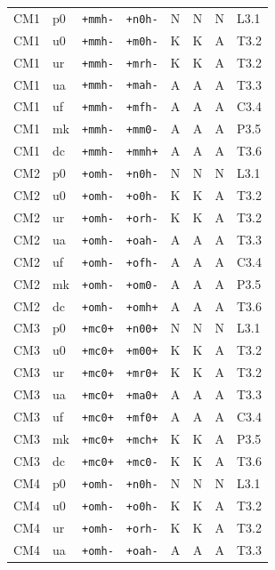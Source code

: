 {\begin{longtable}{@{}llllcccl@{}}
CM1 & p0 & \texttt{+mmh-} & \texttt{+n0h-} & N & N & N & L3.1 \\
CM1 & u0 & \texttt{+mmh-} & \texttt{+m0h-} & K & K & A & T3.2 \\
CM1 & ur & \texttt{+mmh-} & \texttt{+mrh-} & K & K & A & T3.2 \\
CM1 & ua & \texttt{+mmh-} & \texttt{+mah-} & A & A & A & T3.3 \\
CM1 & uf & \texttt{+mmh-} & \texttt{+mfh-} & A & A & A & C3.4 \\
CM1 & mk & \texttt{+mmh-} & \texttt{+mm0-} & A & A & A & P3.5 \\
CM1 & dc & \texttt{+mmh-} & \texttt{+mmh+} & A & A & A & T3.6 \\
CM2 & p0 & \texttt{+omh-} & \texttt{+n0h-} & N & N & N & L3.1 \\
CM2 & u0 & \texttt{+omh-} & \texttt{+o0h-} & K & K & A & T3.2 \\
CM2 & ur & \texttt{+omh-} & \texttt{+orh-} & K & K & A & T3.2 \\
CM2 & ua & \texttt{+omh-} & \texttt{+oah-} & A & A & A & T3.3 \\
CM2 & uf & \texttt{+omh-} & \texttt{+ofh-} & A & A & A & C3.4 \\
CM2 & mk & \texttt{+omh-} & \texttt{+om0-} & A & A & A & P3.5 \\
CM2 & dc & \texttt{+omh-} & \texttt{+omh+} & A & A & A & T3.6 \\
CM3 & p0 & \texttt{+mc0+} & \texttt{+n00+} & N & N & N & L3.1 \\
CM3 & u0 & \texttt{+mc0+} & \texttt{+m00+} & K & K & A & T3.2 \\
CM3 & ur & \texttt{+mc0+} & \texttt{+mr0+} & K & K & A & T3.2 \\
CM3 & ua & \texttt{+mc0+} & \texttt{+ma0+} & A & A & A & T3.3 \\
CM3 & uf & \texttt{+mc0+} & \texttt{+mf0+} & A & A & A & C3.4 \\
CM3 & mk & \texttt{+mc0+} & \texttt{+mch+} & K & K & A & P3.5 \\
CM3 & dc & \texttt{+mc0+} & \texttt{+mc0-} & K & K & A & T3.6 \\
CM4 & p0 & \texttt{+omh-} & \texttt{+n0h-} & N & N & N & L3.1 \\
CM4 & u0 & \texttt{+omh-} & \texttt{+o0h-} & K & K & A & T3.2 \\
CM4 & ur & \texttt{+omh-} & \texttt{+orh-} & K & K & A & T3.2 \\
CM4 & ua & \texttt{+omh-} & \texttt{+oah-} & A & A & A & T3.3 \\

\end{longtable}}
